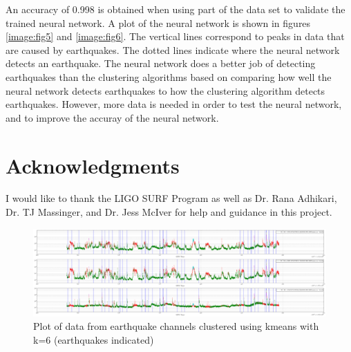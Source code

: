 \documentclass[colorlinks=true,pdfstartview=FitV,linkcolor=blue,
            citecolor=red,urlcolor=magenta]{ligodoc}
\begin{document}
\par An accuracy of 0.998 is obtained when using part of the data set to validate the trained neural network. A plot of the neural network is shown in figures \ref{image:fig5} and  \ref{image:fig6}. The vertical lines correspond to peaks in data that are caused by earthquakes. The dotted lines indicate where the neural network detects an earthquake. The neural network does a better job of detecting earthquakes than the clustering algorithms based on comparing how well the neural network detects earthquakes to how the clustering algorithm detects earthquakes. However, more data is needed in order to test the neural network, and to improve the accuray of the neural network. 

\section{Acknowledgments}

\indent

\par I would like to thank the LIGO SURF Program as well as  Dr. Rana Adhikari, Dr. TJ Massinger, and Dr. Jess McIver for help and guidance in this project.

\begin{figure}[htbp]
\begin{center}
\includegraphics[width=1.3\textwidth,angle=90]{EQdata_Kmeans_6_.png}
\caption{Plot of data from earthquake channels clustered using kmeans with k=6 (earthquakes indicated)}
\label{fig:image1}
\end{center}
\end{figure}
\end{document}
